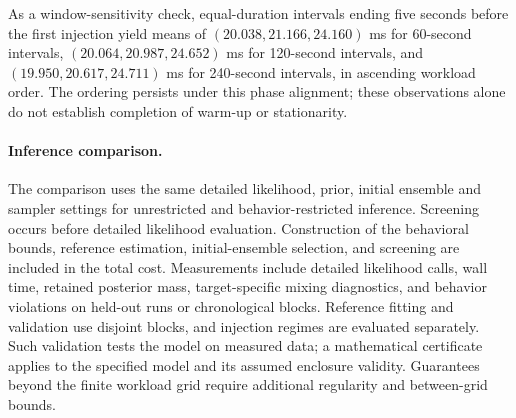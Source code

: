 As a window-sensitivity check, equal-duration intervals ending five seconds
before the first injection yield means of $(20.038,21.166,24.160)$ ms for
60-second intervals, $(20.064,20.987,24.652)$ ms for 120-second intervals, and
$(19.950,20.617,24.711)$ ms for 240-second intervals, in ascending workload order.
The ordering persists under this phase alignment; these observations alone do
not establish completion of warm-up or stationarity.

\paragraph{Inference comparison.}
The comparison uses the same detailed likelihood, prior, initial ensemble and
sampler settings for unrestricted and behavior-restricted inference. Screening
occurs before detailed likelihood evaluation. Construction of the behavioral
bounds, reference estimation, initial-ensemble selection, and screening are
included in the total cost. Measurements include detailed likelihood calls,
wall time, retained posterior mass, target-specific mixing diagnostics, and
behavior violations on held-out runs or chronological blocks. Reference fitting
and validation use disjoint blocks, and injection regimes are evaluated
separately. Such validation tests the model on measured data; a mathematical
certificate applies to the specified model and its assumed enclosure validity.
Guarantees beyond the finite workload grid require additional regularity and
between-grid bounds.

